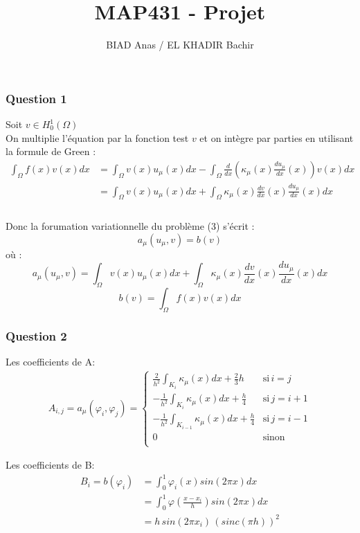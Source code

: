 \documentclass{article}
\newcommand{\Deriv}[1]{\ensuremath{\frac{d}{dx}(#1)}}
\newcommand{\DDeriv}[1]{\ensuremath{\frac{d#1}{dx}}}
\newcommand{\Q}[1]{\subsubsection*{Question #1}}
\begin{document}
\title{MAP431 - Projet}
\author{BIAD Anas / EL KHADIR Bachir}


\maketitle

\Q{1} 

Soit $ v \in H_{0}^{1}(\Omega) $ \\
On multiplie l'équation par la fonction test $v$ et on intègre par parties en utilisant la formule de Green : 
\begin{align*} 
 \int_{\Omega}  f(x)v(x)dx   &=  \int_{\Omega}  v(x)u_{\mu}(x)dx   -  \int_{\Omega}  \Deriv{ \kappa_{\mu}(x) \DDeriv{u_{\mu}}(x) } v(x)dx  \\
&= \int_{\Omega}  v(x)u_{\mu}(x)dx  +  \int_{\Omega}  \kappa_{\mu}(x) \DDeriv{v}(x) \DDeriv{u_{\mu}}(x) dx \\
\end{align*}
\\
Donc la forumation variationnelle du problème (3) s'écrit : 
$$a_{\mu}(u_{\mu},v) = b(v)$$ 
où : 
$$a_{\mu}(u_{\mu},v) = \int_{\Omega}  v(x)u_{\mu}(x)dx  +   \int_{\Omega}  \kappa_{\mu}(x) \DDeriv{v}(x) \DDeriv{u_{\mu}}(x) dx $$ 
$$b(v) =  \int_{\Omega}  f(x)v(x)dx $$

\Q{2}

Les coefficients de A:
\begin{align*}
A_{i,j} = a_{\mu}(\varphi_{i},\varphi_{j}) =
\left\{\begin{array}{ll}
\frac{2}{h^{2}} \int_{K_{i}} \kappa_{\mu}(x) dx + \frac{2}{3}h & \mbox{si} \, i = j \\
-\frac{1}{h^{2}} \int_{K_{i}} \kappa_{\mu}(x) dx + \frac{h}{4} & \mbox{si} \, j = i+1 \\
-\frac{1}{h^{2}} \int_{K_{i-1}} \kappa_{\mu}(x) dx + \frac{h}{4} & \mbox{si} \, j = i-1 \\
0 & \mbox{sinon} \\
\end{array}
\right.
\end{align*}

Les coefficients de B:
\begin{align*}
B_i = b(\varphi_{i}) &= \int_{0}^{1} \varphi_{i}(x) sin(2\pi x)dx  \\
&= \int_{0}^{1} \varphi(\frac{x-x_{i}}{h}) sin(2\pi x)dx \\
&= h \, sin(2 \pi x_{i}) \,  (sinc(\pi h))^{2}
\end{align*}
\end{document}

